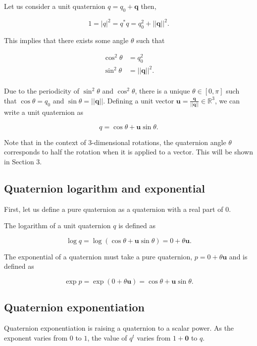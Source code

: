 \documentclass[a4paper, 11pt]{article}
\begin{document}
Let us consider a unit quaternion $q=q_0 + \boldsymbol{q}$ then, 

\[1= |q|^2 = q^*q = q_0^2+ ||\boldsymbol{q}||^2.\]

This implies that there exists some angle $\theta$ such that 



\[
\begin{aligned}
\cos^2\theta &= q_0^2 \\
\sin^2\theta &= ||\boldsymbol{q}||^2.\\
\end{aligned}\]

Due to the periodicity of $\sin^2\theta$ and $\cos^2\theta$, there is a unique $\theta \in [0,\pi]$ such that $\cos\theta = q_0 $ and $\sin\theta = ||\boldsymbol{q}||$. Defining a unit vector $\boldsymbol{u} = \frac{\boldsymbol{q}}{||\boldsymbol{q}||} \in \mathbb{R}^3$, we can write a unit quaternion as

\[ q = \cos\theta + \boldsymbol{u}\sin\theta.\]
\citep[p.~4]{jia_2013_quaternions}

Note that in the context of 3-dimensional rotations, the quaternion angle $\theta$ corresponds to half the rotation when it is applied to a vector. This will be shown in Section 3. 
 
\subsection{Quaternion logarithm and exponential}

First, let us define a pure quaternion as a quaternion with a real part of $0$.

The logarithm of a unit quaternion $q$ is defined as

\[\log q = \log (\cos\theta  + \boldsymbol{u}\sin\theta) =   0 + \theta \boldsymbol{u}.\] \citep[p.~170]{dunn_parberry_2002}

The exponential of a  quaternion must take a pure quaternion, $p = 0 + \theta\boldsymbol{u}$ and is defined as 

\[\exp p = \exp (0 +\theta\boldsymbol{u}) = \cos \theta + \boldsymbol{u}\sin\theta.\] \citep[p.~170]{dunn_parberry_2002}

\subsection{Quaternion exponentiation}

Quaternion exponentiation is raising a quaternion to a scalar power. As the exponent varies from $0$ to $1$, the value of $q^t$ varies from $1 + \boldsymbol{0}$ to $q$. 
\end{document}
